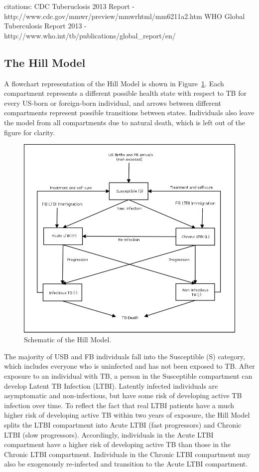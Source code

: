 \documentclass{amsart}
\begin{document}
citations: CDC Tuberuclosis 2013 Report - http://www.cdc.gov/mmwr/preview/mmwrhtml/mm6211a2.htm
WHO Global Tuberculosis Report 2013 - http://www.who.int/tb/publications/global\_report/en/ \\

\subsection{The Hill Model}
A flowchart representation of the Hill Model is shown in
Figure~\ref{fig:hillModelSchematic}. Each compartment represents a different
possible health state with respect to TB for every US-born or foreign-born
individual, and arrows between different compartments represent possible
transitions between states.  Individuals also leave the model from all
compartments due to natural death, which is left out of the figure for clarity.

\begin{figure}[h]
  \begin{center}
    \includegraphics[scale=0.25]{figures/HillModelFlowChart.png}
  \end{center}
  \caption{Schematic of the Hill Model.}
  \label{fig:hillModelSchematic}
\end{figure}

The majority of USB and FB individuals fall into the Susceptible (S) category,
which includes everyone who is uninfected and has not been exposed to TB.  After
exposure to an individual with TB, a person in the Susceptible compartment can
develop Latent TB Infection (LTBI). Latently infected individuals are
asymptomatic and non-infectious, but have some risk of developing active TB
infection over time. To reflect the fact that real LTBI patients have a
much higher risk of developing active TB within two years of exposure, the Hill
Model splits the LTBI compartment into Acute LTBI (fast progressors) and Chronic
LTBI (slow progressors). Accordingly, individuals in the Acute LTBI compartment
have a higher risk of developing active TB than those in the Chronic LTBI
compartment. Individuals in the Chronic LTBI compartment may also be
exogenously re-infected and transition to the Acute LTBI compartment. 
\end{document}
